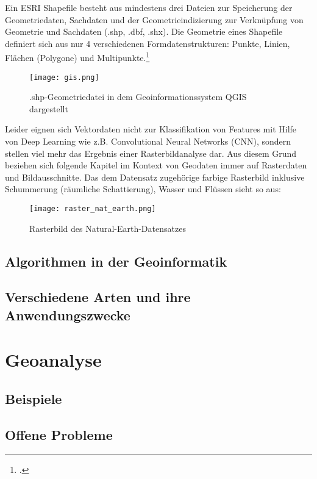\documentclass[11pt,fleqn]{book} %
\begin{document}
\noindent Ein ESRI Shapefile besteht aus mindestens drei Dateien zur Speicherung der Geometriedaten, Sachdaten und der Geometrieindizierung zur Verknüpfung von Geometrie und Sachdaten (.shp, .dbf, .shx). Die Geometrie eines Shapefile definiert sich aus nur 4 verschiedenen Formdatenstrukturen: Punkte, Linien, Flächen (Polygone) und Multipunkte.\footcite{http://www.esri.com/library/whitepapers/pdfs/shapefile.pdf}

\begin{figure}[H]
\centering
\texttt{[image: gis.png]}
\caption{.shp-Geometriedatei in dem Geoinformationssystem QGIS dargestellt \protect\footnotemark}
\end{figure}
\noindent
Leider eignen sich Vektordaten nicht zur Klassifikation von Features mit Hilfe von Deep Learning wie z.B. Convolutional Neural Networks (CNN), sondern stellen viel mehr das Ergebnis einer Rasterbildanalyse dar. Aus diesem Grund beziehen sich folgende Kapitel im Kontext von Geodaten immer auf Rasterdaten und Bildausschnitte.
\newline
Das dem Datensatz zugehörige farbige Rasterbild inklusive Schummerung (räumliche Schattierung), Wasser und Flüssen sieht so aus:

\begin{figure}[H]
\centering
\texttt{[image: raster\_nat\_earth.png]}
\caption{Rasterbild des Natural-Earth-Datensatzes \protect\footnotemark}
\end{figure}




\section{Algorithmen in der Geoinformatik}

\section{Verschiedene Arten und ihre Anwendungszwecke}


\chapter{Geoanalyse}
\section{Beispiele}
\section{Offene Probleme}
\end{document}
